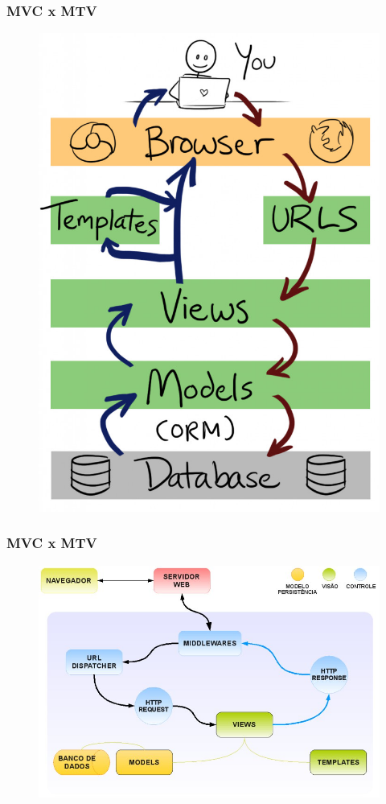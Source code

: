 \documentclass[aspectratio=169]{beamer}
\begin{document}
\begin{frame}\frametitle{MVC x MTV}
	\begin{figure}[h]
	  \centering
  		\includegraphics[height=.8\paperheight]{figuras/mtv-diagram}
	\end{figure}
\end{frame}

\begin{frame}\frametitle{MVC x MTV}
	\begin{figure}[h]
	  \centering
  		\includegraphics[height=.8\paperheight]{figuras/fluxo-no-mvc}
	\end{figure}
\end{frame}
\end{document}
